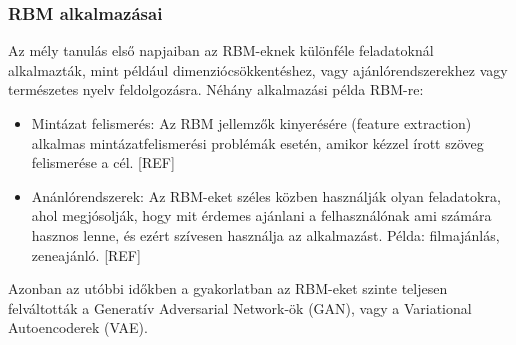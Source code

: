 \subsubsection{RBM alkalmazásai}

Az mély tanulás első napjaiban az RBM-eknek különféle feladatoknál alkalmazták, mint például dimenziócsökkentéshez, vagy ajánlórendszerekhez vagy természetes nyelv feldolgozásra. Néhány alkalmazási példa RBM-re:
\begin{itemize}
	\item Mintázat felismerés: Az RBM jellemzők kinyerésére (feature extraction) alkalmas mintázatfelismerési problémák esetén, amikor kézzel írott szöveg felismerése a cél. [REF]
	\item Anánlórendszerek: Az RBM-eket széles közben használják olyan feladatokra, ahol megjósolják, hogy mit érdemes ajánlani a felhasználónak ami számára hasznos lenne, és ezért szívesen használja az alkalmazást. Példa: filmajánlás, zeneajánló. [REF]
\end{itemize}

Azonban az utóbbi időkben a gyakorlatban az RBM-eket szinte teljesen felváltották a Generatív Adversarial Network-ök (GAN), vagy a Variational Autoencoderek (VAE).



